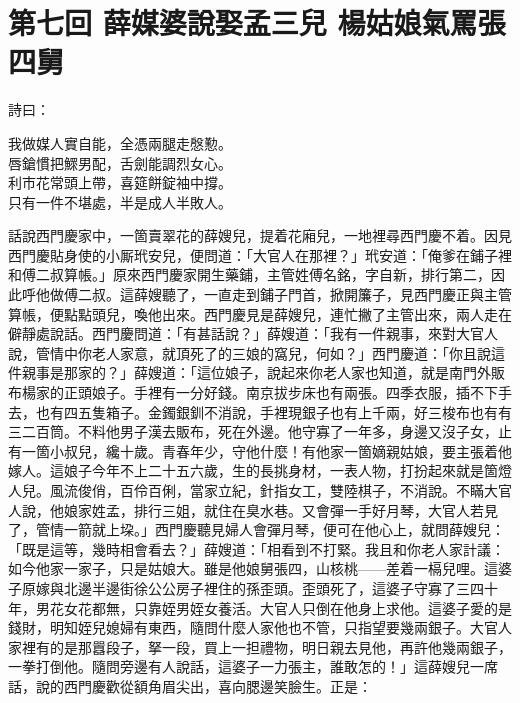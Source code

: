 
\chapter*{第七回 薛媒婆說娶孟三兒 楊姑娘氣罵張四舅}


詩曰：

\begin{myquote} 
我做媒人實自能，全憑兩腿走慇懃。\\唇鎗慣把鰥男配，舌劍能調烈女心。\\利市花常頭上帶，喜筵餅錠袖中撐。\\只有一件不堪處，半是成人半敗人。
\end{myquote} 

話說西門慶家中，一箇賣翠花的薛嫂兒，提着花廂兒，一地裡尋西門慶不着。因見西門慶貼身使的小厮玳安兒，便問道：「大官人在那裡？」玳安道：「俺爹在鋪子裡和傅二叔算帳。」原來西門慶家開生藥鋪，主管姓傅名銘，字自新，排行第二，因此呼他做傅二叔。這薛嫂聽了，一直走到鋪子門首，掀開簾子，見西門慶正與主管算帳，便點點頭兒，喚他出來。西門慶見是薛嫂兒，連忙撇了主管出來，兩人走在僻靜處說話。西門慶問道：「有甚話說？」薛嫂道：「我有一件親事，來對大官人說，管情中你老人家意，就頂死了的三娘的窩兒，{}何如？」西門慶道：「你且說這件親事是那家的？」薛嫂道：「這位娘子，說起來你老人家也知道，就是南門外販布楊家的正頭娘子。手裡有一分好錢。南京拔步床也有兩張。四季衣服，插不下手去，也有四五隻箱子。金鐲銀釧不消說，手裡現銀子也有上千兩，好三梭布也有有三二百筒。不料他男子漢去販布，死在外邊。他守寡了一年多，身邊又沒子女，止有一箇小叔兒，纔十歲。青春年少，守他什麼！有他家一箇嫡親姑娘，要主張着他嫁人。這娘子今年不上二十五六歲，{}生的長挑身材，一表人物，打扮起來就是箇燈人兒。風流俊俏，百伶百俐，當家立紀，針指女工，雙陸棋子，不消說。不瞞大官人說，{}他娘家姓孟，排行三姐，就住在臭水巷。{}又會彈一手好月琴，大官人若見了，管情一箭就上垜。」西門慶聽見婦人會彈月琴，便可在他心上，就問薛嫂兒：「既是這等，幾時相會看去？」薛嫂道：「相看到不打緊。我且和你老人家計議：{}如今他家一家子，只是姑娘大。雖是他娘舅張四，山核桃——差着一槅兒哩。這婆子原嫁與北邊半邊街徐公公房子裡住的孫歪頭。{}歪頭死了，這婆子守寡了三四十年，男花女花都無，只靠姪男姪女養活。大官人只倒在他身上求他。這婆子愛的是錢財，明知姪兒媳婦有東西，隨問什麼人家他也不管，只指望要幾兩銀子。大官人家裡有的是那囂段子，拏一段，買上一担禮物，明日親去見他，再許他幾兩銀子，一拳打倒他。{}隨問旁邊有人說話，這婆子一力張主，誰敢怎的！」這薛嫂兒一席話，說的西門慶歡從額角眉尖出，喜向腮邊笑臉生。正是：

